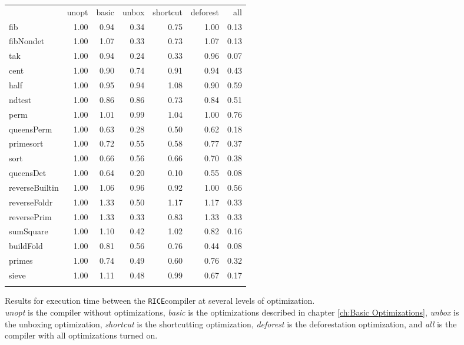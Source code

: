 \documentclass{book}
\newcommand{\rice}{\texttt{RICE}}
\theoremstyle{definition}
\begin{document}
\begin{figure}
\begin{tabular}{||l||r|r|r|r|r|r||}
\hhline{||=||=|=|=|=|=|=||}
                &   unopt & basic & unbox & shortcut & deforest &  all \\
\hhline{||=||=|=|=|=|=|=||}
fib             &    1.00 &  0.94 &  0.34 &     0.75 &     1.00 & 0.13 \\
\hline
fibNondet       &    1.00 &  1.07 &  0.33 &     0.73 &     1.07 & 0.13 \\
\hline
tak             &    1.00 &  0.94 &  0.24 &     0.33 &     0.96 & 0.07 \\
\hhline{||=||=|=|=|=|=|=||}
cent            &    1.00 &  0.90 &  0.74 &     0.91 &     0.94 & 0.43 \\
\hline
half            &    1.00 &  0.95 &  0.94 &     1.08 &     0.90 & 0.59 \\
\hline
ndtest          &    1.00 &  0.86 &  0.86 &     0.73 &     0.84 & 0.51 \\
\hline
perm            &    1.00 &  1.01 &  0.99 &     1.04 &     1.00 & 0.76 \\
\hline
queensPerm      &    1.00 &  0.63 &  0.28 &     0.50 &     0.62 & 0.18 \\
\hline
primesort       &    1.00 &  0.72 &  0.55 &     0.58 &     0.77 & 0.37 \\
\hline
sort            &    1.00 &  0.66 &  0.56 &     0.66 &     0.70 & 0.38 \\
\hhline{||=||=|=|=|=|=|=||}
queensDet       &    1.00 &  0.64 &  0.20 &     0.10 &     0.55 & 0.08 \\
\hline
reverseBuiltin  &    1.00 &  1.06 &  0.96 &     0.92 &     1.00 & 0.56 \\
\hline
reverseFoldr    &    1.00 &  1.33 &  0.50 &     1.17 &     1.17 & 0.33 \\
\hline
reversePrim     &    1.00 &  1.33 &  0.33 &     0.83 &     1.33 & 0.33 \\
\hline
sumSquare       &    1.00 &  1.10 &  0.42 &     1.02 &     0.82 & 0.16 \\
\hline
buildFold       &    1.00 &  0.81 &  0.56 &     0.76 &     0.44 & 0.08 \\
\hline
primes          &    1.00 &  0.74 &  0.49 &     0.60 &     0.76 & 0.32 \\
\hline
sieve           &    1.00 &  1.11 &  0.48 &     0.99 &     0.67 & 0.17 \\
\hhline{||=||=|=|=|=|=|=||}
\end{tabular}

\caption{Results for execution time between the \rice compiler at several levels of optimization.\\
         \emph{unopt} is the compiler without optimizations,
         \emph{basic} is the optimizations described in chapter \ref{ch:Basic Optimizations},
         \emph{unbox} is the unboxing optimization,
         \emph{shortcut} is the shortcutting optimization,
         \emph{deforest} is the deforestation optimization,
         and \emph{all} is the compiler with all optimizations turned on.}
\label{fig:time_rice}
\end{figure}
\end{document}
